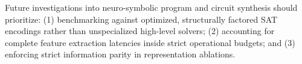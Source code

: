 \documentclass[10pt,journal,compsoc]{IEEEtran}
\begin{document}
Future investigations into neuro-symbolic program and circuit synthesis should prioritize: (1) benchmarking against optimized, structurally factored SAT encodings rather than unspecialized high-level solvers; (2) accounting for complete feature extraction latencies inside strict operational budgets; and (3) enforcing strict information parity in representation ablations.



\end{document}

